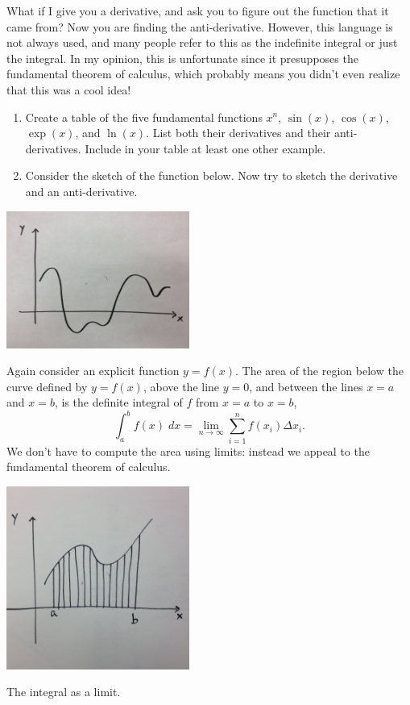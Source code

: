 \documentclass{tufte-handout}
\begin{document}
What if I give you a derivative, and ask you to figure out the function that it came from? Now you are finding the anti-derivative. However, this language is not always used, and many people refer to this as the indefinite integral or just the integral. In my opinion, this is unfortunate since it presupposes the fundamental theorem of calculus, which probably means you didn't even realize that this was a cool idea!

\begin{enumerate}
\item Create a table of the five fundamental functions $x^n$, $\sin(x)$, $\cos(x)$, $\exp(x)$, and $\ln(x)$. List both their derivatives and their anti-derivatives. Include in your table at least one other example.
\item Consider the sketch of the function below. Now try to sketch the derivative and an anti-derivative.
\end{enumerate}

\includegraphics[width=6cm]{figs/crazyfunction}

Again consider an explicit function $y=f(x)$. The area of the region below the curve defined by $y=f(x)$, above the line $y=0$, and between the lines $x=a$ and $x=b$, is the definite integral of $f$ from $x=a$ to $x=b$,
\[\int_a^b f(x) \; dx  = \lim_{n \rightarrow \infty} \sum_{i=1}^n f(x_i) \Delta x_i. \]
We don't have to compute the area using limits: instead we appeal to the fundamental theorem of calculus.

\begin{marginfigure}
\includegraphics[width=6cm]{figs/integration}
\caption{The integral as a limit.}
\end{marginfigure}
\end{document}

